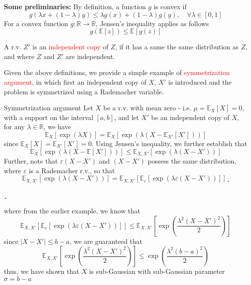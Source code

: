 \documentclass[10pt,handout,english]{beamer}
\newcommand{\E}{\mathbb{E}}
\newcommand{\R}{\mathbb{R}}
\newcommand{\1}{\mathbbm{1}}
\begin{document}
\begin{frame}
\textbf{Some preliminaries:} By definition, a function $g$ is convex if 
\[
g(\lambda x+(1-\lambda)y)\leq \lambda g(x)+(1-\lambda)g(y),\quad \forall \lambda\in[0,1]
\]
For a convex function $g:\R\to\R$, Jensen's inequality applies as follows
\[
g(\E[z])\leq \E[g(z)]
\] 

A r.v. $Z'$ is an \textcolor{red}{independent copy} of $Z$, if it has a same the same distribution as $Z$, and where $Z$ and $Z'$ are independent. 

Given the above definitions, we provide a simple example of \textcolor{red}{symmetrization argument}, in which first an independent copy of $X$, $X'$ is introduced and the problem is symmetrized using a Rademacher variable.
\end{frame}

\begin{frame}
\begin{block}{Symmetrization argument}
Let $X$ be a r.v. with mean zero - i.e. $\mu=\E_X[X]=0$, with a support on the interval $[a,b]$, and let $X'$ be an independent copy of $X$, for any $\lambda\in\R$, we have
\[
\E_X[\exp(\lambda X)]=\E_X[\exp(\lambda(X-\E_{X'}[X']))]
\]
since $\E_X[X]=\E_{X'}[X']=0$. Using Jensen's inequality, we further establish that
\[
\E_X[\exp(\lambda(X-\E[X']))]\leq \E_{X,X'}[\exp(\lambda(X-X'))] 
\]
Further, note that $\varepsilon(X-X')$ and $(X-X')$ possess the same distribution, where $\varepsilon$ is a Rademacher r.v., so that
\[
\E_{X,X'}[\exp(\lambda(X-X'))]=\E_{X,X'}[\E_{\varepsilon}[\exp(\lambda\varepsilon(X-X'))]]¸
\]
\end{block}
\end{frame}
\begin{frame}¸
\begin{block}{}
where from the earlier example, we know that
\[
\E_{X,X'}[\E_{\varepsilon}[\exp(\lambda\varepsilon(X-X'))]]\leq \E_{X,X'}\left[\exp\left(\frac{\lambda^2(X-X')^2}{2}\right)\right]
\]
since $\lvert X-X' \rvert\leq b-a$, we are guaranteed that
\[
\E_{X,X'}\left[\exp\left(\frac{\lambda^2(X-X')^2}{2}\right)\right]\leq\exp\left(\frac{\lambda^2(b-a)^2}{2}\right)
\]
thus, we have shown that $X$ is sub-Gaussian with sub-Gaussian parameter $\sigma=b-a$
\end{block}
\end{frame}
\end{document}
